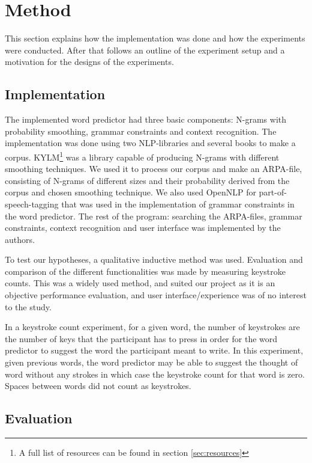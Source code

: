 \section{Method}
This section explains how the implementation was done and how the experiments were conducted. After that follows an outline of the experiment setup and a motivation for the designs of the experiments.
\subsection{Implementation}
The implemented word predictor had three basic components: N-grams with probability smoothing, grammar constraints and context recognition. The implementation was done using two NLP-libraries and several books to make a corpus. KYLM\footnote{A full list of resources can be found in section \ref{sec:resources}} was a library capable of producing N-grams with different smoothing techniques. We used it to process our corpus and make an ARPA-file, consisting of N-grams of different sizes and their probability derived from the corpus and chosen smoothing technique. We also used OpenNLP for part-of-speech-tagging that was used in the implementation of grammar constraints in the word predictor. The rest of the program: searching the ARPA-files, grammar constraints, context recognition and user interface was implemented by the authors.

To test our hypotheses, a qualitative inductive method was used. Evaluation and comparison of the different functionalities was made by measuring keystroke counts. This was a widely used method\cite{keystrokes}, and suited our project as it is an objective performance evaluation, and user interface/experience was of no interest to the study.

In a keystroke count experiment, for a given word, the number of keystrokes are the number of keys that the participant has to press in order for the word predictor to suggest the word the participant meant to write. In this experiment, given previous words, the word predictor may be able to suggest the thought of word without any strokes in which case the keystroke count for that word is zero. Spaces between words did not count as keystrokes.

\subsection{Evaluation}

